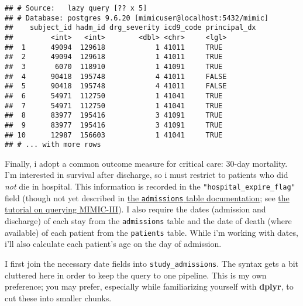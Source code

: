\documentclass[
]{article}
\begin{document}
\begin{verbatim}
## # Source:   lazy query [?? x 5]
## # Database: postgres 9.6.20 [mimicuser@localhost:5432/mimic]
##    subject_id hadm_id drg_severity icd9_code principal_dx
##         <int>   <int>        <dbl> <chr>     <lgl>       
##  1      49094  129618            1 41011     TRUE        
##  2      49094  129618            1 41011     TRUE        
##  3       6070  118910            1 41091     TRUE        
##  4      90418  195748            4 41011     FALSE       
##  5      90418  195748            4 41011     FALSE       
##  6      54971  112750            1 41041     TRUE        
##  7      54971  112750            1 41041     TRUE        
##  8      83977  195416            3 41091     TRUE        
##  9      83977  195416            3 41091     TRUE        
## 10      12987  156603            1 41041     TRUE        
## # ... with more rows
\end{verbatim}

Finally, i adopt a common outcome measure for critical care: 30-day
mortality. I'm interested in survival after discharge, so i must
restrict to patients who did \emph{not} die in hospital. This
information is recorded in the \texttt{"hospital\_expire\_flag"} field
(though not yet described in
\href{https://mimic.physionet.org/mimictables/admissions/}{the
\texttt{admissions} table documentation}; see
\href{https://mimic.physionet.org/tutorials/intro-to-mimic-iii/}{the
tutorial on querying MIMIC-III}). I also require the dates (admission
and discharge) of each stay from the \texttt{admissions} table and the
date of death (where available) of each patient from the
\texttt{patients} table. While i'm working with dates, i'll also
calculate each patient's age on the day of admission.

I first join the necessary date fields into \texttt{study\_admissions}.
The syntax gets a bit cluttered here in order to keep the query to one
pipeline. This is my own preference; you may prefer, especially while
familiarizing yourself with \textbf{dplyr}, to cut these into smaller
chunks.
\end{document}
